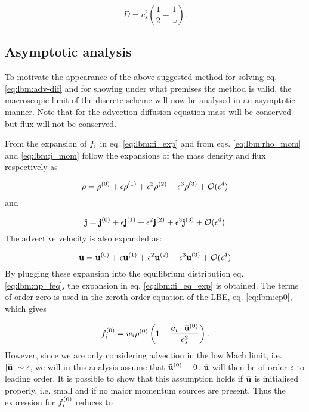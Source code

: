 \begin{equation}\label{eq:lbm:np_D}
D = c_s^2 \left( \frac{1}{2} - \frac{1}{\omega} \right).
\end{equation}

\subsection{Asymptotic analysis}\label{sec:lbm:asym_np}
To motivate the appearance of the above suggested method for solving
eq. \eqref{eq:lbm:adv-dif} and for showing under what premises the
method is valid, the macroscopic limit of the discrete scheme will now
be analysed in an asymptotic manner. Note that for the advection
diffusion equation mass will be conserved but flux will not be
conserved.

From the expansion of $f_i$ in eq. \eqref{eq:lbm:fi_exp} and from
eqs. \eqref{eq:lbm:rho_mom} and \eqref{eq:lbm:j_mom} follow the
expansions of the mass density and flux respectively as

\begin{equation}\label{eq:lbm:rho_exp}
\rho = \rho^{(0)} + \epsilon\rho^{(1)} + \epsilon^2\rho^{(2)} + \epsilon^3\rho^{(3)} + \mathcal{O}(\epsilon^4)
\end{equation} 
and

\begin{equation}
\mathbf{j} = \mathbf{j}^{(0)} + \epsilon\mathbf{j}^{(1)} + \epsilon^2\mathbf{j}^{(2)} + \epsilon^3\mathbf{j}^{(3)} + \mathcal{O}(\epsilon^4)
\end{equation} 
The advective velocity is also expanded as: 

\begin{equation}
\mathbf{\bar{u}} = \mathbf{\bar{u}}^{(0)} + \epsilon\mathbf{\bar{u}}^{(1)} + \epsilon^2\mathbf{\bar{u}}^{(2)} + \epsilon^3\mathbf{\bar{u}}^{(3)} + \mathcal{O}(\epsilon^4)
\end{equation}
By plugging these expansion into the equilibrium distribution
eq. \eqref{eq:lbm:np_feq}, the expansion in
eq. \eqref{eq:lbm:fi_eq_exp} is obtained. The terms of order zero is
used in the zeroth order equation of the LBE, eq. \eqref{eq:lbm:ep0},
which gives

\begin{equation}
f_i^{(0)} = w_i\rho^{(0)} \left( 1 + \frac{\mathbf{c}_i \cdot \mathbf{\bar{u}}^{(0)}}{c_s^2} \right).
\end{equation}
However, since we are only considering advection in the low Mach
limit, i.e. $|\mathbf{\bar{u}}| \sim \epsilon$, we will in this analysis assume that
$\mathbf{\bar{u}}^{(0)} = 0$. $\mathbf{\bar{u}}$ will then be of order $\epsilon$ to leading
order. It is possible to show \cite{junk-asym} that this assumption
holds if $\mathbf{\bar{u}}$ is initialised properly, i.e. small and if no major
momentum sources are present. Thus the expression for $f_i^{(0)}$
reduces to

